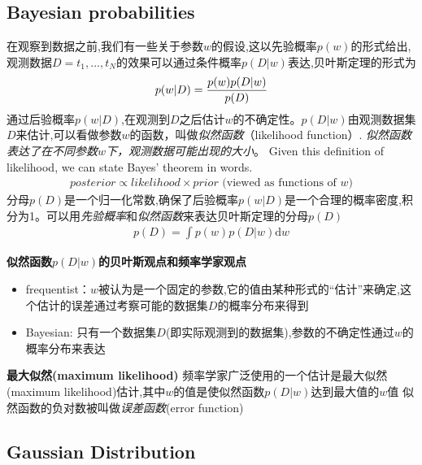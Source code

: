 \documentclass[a4paper]{article}
\begin{document}
\subsection{Bayesian probabilities}
在观察到数据之前,我们有一些关于参数$w$的假设,这以先验概率$p(w)$的形式给出,观测数据$D = {t_1,...,t_N}$的效果可以通过条件概率$p(D|w)$表达,贝叶斯定理的形式为
\begin{align}
  p(w|D) = { p(w)p(D|w) \over p(D) }
\end{align}
通过后验概率$p(w|D)$,在观测到$D$之后估计$w$的不确定性。$p(D|w)$由观测数据集$D$来估计,可以看做参数$w$的函数，叫做\textit{似然函数}（likelihood function）.
\emph{似然函数表达了在不同参数$w$下，观测数据可能出现的大小}。
Given this definition of likelihood, we can state Bayes' theorem in words.
\begin{align}
  posterior \propto likelihood \times prior \text{ (viewed as functions of $w$)}
\end{align}
分母$p(D)$是一个归一化常数,确保了后验概率$p(w|D)$是一个合理的概率密度,积分为1。可以用\emph{先验概率}和\emph{似然函数}来表达贝叶斯定理的分母$p(D)$
\begin{align}
  p(D) = \int p(w) p(D|w) \mathrm{d} w
\end{align}

\textbf{似然函数$p(D|w)$的贝叶斯观点和频率学家观点}
\begin{itemize}
\item frequentist：$w$被认为是一个固定的参数,它的值由某种形式的“估计”来确定,这个估计的误差通过考察可能的数据集$D$的概率分布来得到
\item Bayesian: 只有一个数据集$D$(即实际观测到的数据集),参数的不确定性通过$w$的概率分布来表达
\end{itemize}

\textbf{最大似然(maximum likelihood)}
频率学家广泛使用的一个估计是最大似然(maximum likelihood)估计,其中$w$的值是使似然函数$p(D|w)$达到最大值的$w$值
似然函数的负对数被叫做\emph{误差函数}(error function)

\subsection{Gaussian Distribution}
\end{document}
